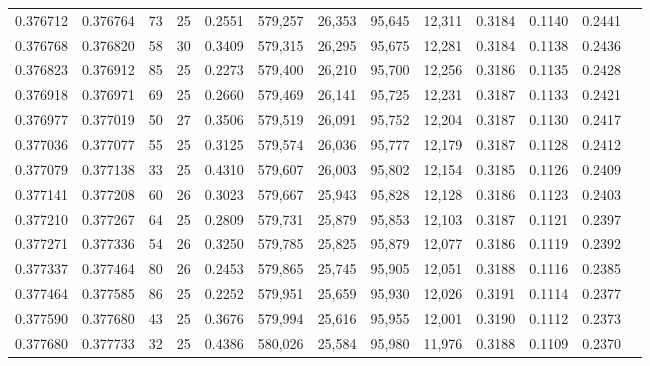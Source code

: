 \begin{tabular}{rrrrrrrrrrrrr}
0.376712 & 0.376764 &    73 &  25 &                                     0.2551 & 579,257 &  26,353 &  95,645 &  12,311 & 0.3184 & 0.1140 & 0.2441 \\
0.376768 & 0.376820 &    58 &  30 &                                     0.3409 & 579,315 &  26,295 &  95,675 &  12,281 & 0.3184 & 0.1138 & 0.2436 \\
0.376823 & 0.376912 &    85 &  25 &                                     0.2273 & 579,400 &  26,210 &  95,700 &  12,256 & 0.3186 & 0.1135 & 0.2428 \\
0.376918 & 0.376971 &    69 &  25 &                                     0.2660 & 579,469 &  26,141 &  95,725 &  12,231 & 0.3187 & 0.1133 & 0.2421 \\
0.376977 & 0.377019 &    50 &  27 &                                     0.3506 & 579,519 &  26,091 &  95,752 &  12,204 & 0.3187 & 0.1130 & 0.2417 \\
0.377036 & 0.377077 &    55 &  25 &                                     0.3125 & 579,574 &  26,036 &  95,777 &  12,179 & 0.3187 & 0.1128 & 0.2412 \\
0.377079 & 0.377138 &    33 &  25 &                                     0.4310 & 579,607 &  26,003 &  95,802 &  12,154 & 0.3185 & 0.1126 & 0.2409 \\
0.377141 & 0.377208 &    60 &  26 &                                     0.3023 & 579,667 &  25,943 &  95,828 &  12,128 & 0.3186 & 0.1123 & 0.2403 \\
0.377210 & 0.377267 &    64 &  25 &                                     0.2809 & 579,731 &  25,879 &  95,853 &  12,103 & 0.3187 & 0.1121 & 0.2397 \\
0.377271 & 0.377336 &    54 &  26 &                                     0.3250 & 579,785 &  25,825 &  95,879 &  12,077 & 0.3186 & 0.1119 & 0.2392 \\
0.377337 & 0.377464 &    80 &  26 &                                     0.2453 & 579,865 &  25,745 &  95,905 &  12,051 & 0.3188 & 0.1116 & 0.2385 \\
0.377464 & 0.377585 &    86 &  25 &                                     0.2252 & 579,951 &  25,659 &  95,930 &  12,026 & 0.3191 & 0.1114 & 0.2377 \\
0.377590 & 0.377680 &    43 &  25 &                                     0.3676 & 579,994 &  25,616 &  95,955 &  12,001 & 0.3190 & 0.1112 & 0.2373 \\
0.377680 & 0.377733 &    32 &  25 &                                     0.4386 & 580,026 &  25,584 &  95,980 &  11,976 & 0.3188 & 0.1109 & 0.2370 \\

\end{tabular}
